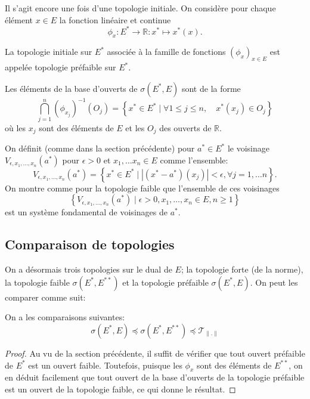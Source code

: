 Il s'agit encore une fois d'une topologie initiale. On considère pour
chaque élément $x\in E$ la fonction linéaire et continue
$$\phi_x: E^*\to\mathbb R: x^*\mapsto x^*(x).$$

\begin{df}
  La topologie initiale sur $E^*$ associée à la famille de fonctions
  $\left(\phi_x\right)_{x\in E}$ est appelée topologie préfaible sur $E^*$.
\end{df}

Les éléments de la base d'ouverts de $\sigma(E^*, E)$ sont
de la forme
\begin{equation*}
  \bigcap_{j=1}^n (\phi_{x_j})^{-1}(O_j) =
  \left\{ x^*\in E^*\mid \forall 1\leq j\leq n,\quad x^*(x_j)\in O_j\right\}
\end{equation*}
où les $x_j$ sont des éléments de $E$ et les $O_j$ des ouverts de $\mathbb R$.

On définit (comme dans la section précédente) pour $a^*\in E^*$ le voisinage
$V_{\epsilon, x_1, \ldots, x_n}(a^*)$ pour $\epsilon > 0$ et
$x_1, \ldots x_n\in E$ comme l'ensemble:
$$ V_{\epsilon, x_1, \ldots, x_n}(a^*) = \left\{
 x^*\in E^* \mid |(x^*-a^*)(x_j) | <\epsilon, \forall j = 1, \ldots n\right\}.$$
On montre comme pour la topologie faible que l'ensemble de ces voisinages
$$\left\{V_{\epsilon, x_1, \ldots, x_n}(a^*)\mid
  \epsilon > 0, x_1, \ldots, x_n\in E, n\geq 1\right\}$$
est un système fondamental de voisinages de $a^*$.

\subsection{Comparaison de topologies}
On a désormais trois topologies sur le dual de $E$; la topologie forte
(de la norme), la topologie faible $\sigma(E^*, E^{**})$ et la topologie
préfaible $\sigma(E^*, E)$. On peut les comparer comme suit:
\begin{prop}
  On a les comparaisons suivantes:
  $$\sigma(E^*, E) \preceq \sigma(E^*, E^{**}) \preceq \mathcal{T}_{\|.\|}$$
\end{prop}
\begin{proof}
  Au vu de la section précédente, il suffit de vérifier que tout ouvert
  préfaible de $E^*$ est un ouvert faible. Toutefois, puisque
  les $\phi_x$ sont des éléments de $E^{**}$, on en déduit facilement
  que tout ouvert de la base d'ouverts de la topologie préfaible
  est un ouvert de la topologie faible, ce qui donne le résultat.
\end{proof}

